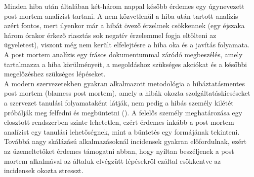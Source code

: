 Minden hiba után általában két-három nappal később érdemes egy úgynevezett post mortem analízist tartani. A nem közvetlenül a hiba után tartott analízis azért fontos, mert ilyenkor már a hibát övező érzelmek csökkennek (egy éjszaka három órakor érkező riasztás sok negatív érzelemmel fogja eltölteni az ügyeletest), viszont még nem került elfelejtésre a hiba oka és a javítás folyamata. A post mortem analízis egy írásos dokumentummal záródó megbeszélés, amely tartalmazza a hiba körülményeit, a megoldáshoz szükséges akciókat és a későbbi megelőzéshez szükséges lépéseket.\hfill\\
A modern szervezetekben gyakran alkalmazott metodológia a hibáztatásmentes post mortem (blamess post mortem), amely a hibák okozta szolgáltatáskieséseket a szervezet tanulási folyamataként látják, nem pedig a hibás személy kilétét próbálják meg felfedni és megbüntetni (\cite{blameless_post_mortem}).
A felelős személy meghatározása egy elosztott rendszerben szinte lehetetlen, ezért érdemes inkább a post mortem analízist egy tanulási lehetőségnek, mint a büntetés egy formájának tekinteni. Továbbá nagy skálázású alkalmazásoknál incidensek gyakran előfordulnak, ezért az üzemeltetőket érdemes támogatni abban, hogy nyíltan beszéljenek a post mortem alkalmával az általuk elvégzütt lépésekről ezáltal csökkentve az incidensek okozta stresszt.